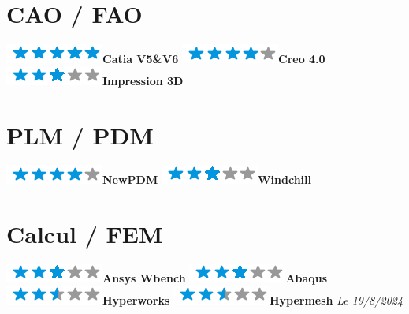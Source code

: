\documentclass[]{friggeri-cv}
\begin{document}
\begin{aside}
\section{CAO / FAO}
\includegraphics[scale=0.40]{res/img/5stars.png}\hspace{1.5mm}\textbf{Catia V5\&V6}
\includegraphics[scale=0.40]{res/img/4stars.png}\hspace{1.5mm}\textbf{Creo 4.0}
\includegraphics[scale=0.40]{res/img/3stars.png}\hspace{1.5mm}\textbf{Impression 3D}\section{PLM / PDM}
\includegraphics[scale=0.40]{res/img/4stars.png}\hspace{1.5mm}\textbf{NewPDM}
\includegraphics[scale=0.40]{res/img/3stars.png}\hspace{1.5mm}\textbf{Windchill}\section{Calcul / FEM}
\includegraphics[scale=0.40]{res/img/3stars.png}\hspace{1.5mm}\textbf{Ansys Wbench}
\includegraphics[scale=0.40]{res/img/3stars.png}\hspace{1.5mm}\textbf{Abaqus}
\includegraphics[scale=0.40]{res/img/2-5stars.png}\hspace{1.5mm}\textbf{Hyperworks}
\includegraphics[scale=0.40]{res/img/2-5stars.png}\hspace{1.5mm}\textbf{Hypermesh}
\vspace{2.5mm}%
	\emph{Le 19/8/2024} \hspace*{8mm}
\end{aside}
\end{document}
